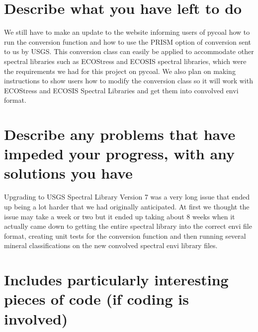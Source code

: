 \documentclass[onecolumn, draftclsnofoot,10pt, compsoc]{IEEEtran}
\begin{document}
\section{Describe what you have left to do}

We still have to make an update to the website informing users of pycoal how to run the conversion function and how to use the PRISM option of conversion sent to us by USGS. This conversion class can easily be applied to accommodate other spectral libraries such as ECOStress and ECOSIS spectral libraries, which were the requirements we had for this project on pycoal. \newline \newline
We also plan on making instructions to show users how to modify the conversion class so it will work with ECOStress and ECOSIS Spectral Libraries and get them into convolved envi format.

\section{Describe any problems that have impeded your progress, with any solutions you have}

Upgrading to USGS Spectral Library Version 7 was a very long issue that ended up being a lot harder that we had originally anticipated. At first we thought the issue may take a week or two but it ended up taking about 8 weeks when it actually came down to getting the entire spectral library into the correct envi file format, creating unit tests for the conversion function and then running several mineral classifications on the new convolved spectral envi library files.

\section{Includes particularly interesting pieces of code (if coding is involved)}
\end{document}
